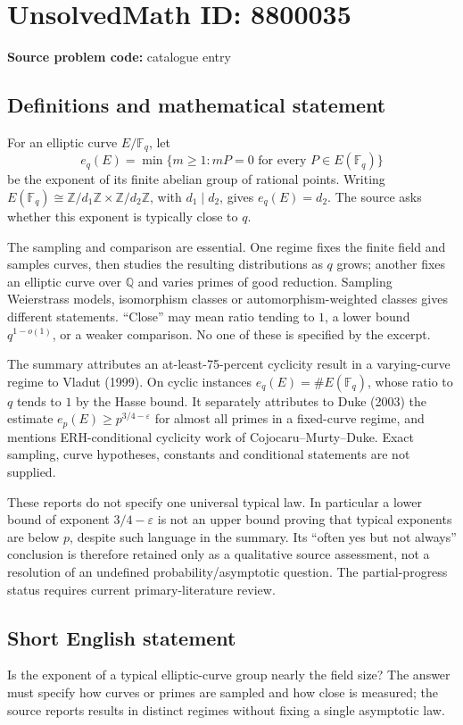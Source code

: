 \documentclass[11pt]{article}
\begin{document}
\section*{UnsolvedMath ID: 8800035}
\textbf{Source problem code:} catalogue entry
\subsection{Definitions and mathematical statement}
For an elliptic curve \(E/\mathbb F_q\), let
\[
 e_q(E)=\min\{m\ge1:mP=0\text{ for every }P\in E(\mathbb F_q)\}
\]
be the exponent of its finite abelian group of rational points. Writing \(E(\mathbb F_q)\cong\mathbb Z/d_1\mathbb Z\times\mathbb Z/d_2\mathbb Z\), with \(d_1\mid d_2\), gives \(e_q(E)=d_2\). The source asks whether this exponent is typically close to \(q\).

The sampling and comparison are essential. One regime fixes the finite field and samples curves, then studies the resulting distributions as \(q\) grows; another fixes an elliptic curve over \(\mathbb Q\) and varies primes of good reduction. Sampling Weierstrass models, isomorphism classes or automorphism-weighted classes gives different statements. ``Close'' may mean ratio tending to \(1\), a lower bound \(q^{1-o(1)}\), or a weaker comparison. No one of these is specified by the excerpt.

The summary attributes an at-least-75-percent cyclicity result in a varying-curve regime to Vladut (1999). On cyclic instances \(e_q(E)=\#E(\mathbb F_q)\), whose ratio to \(q\) tends to \(1\) by the Hasse bound. It separately attributes to Duke (2003) the estimate \(e_p(E)\ge p^{3/4-\varepsilon}\) for almost all primes in a fixed-curve regime, and mentions ERH-conditional cyclicity work of Cojocaru--Murty--Duke. Exact sampling, curve hypotheses, constants and conditional statements are not supplied.

These reports do not specify one universal typical law. In particular a lower bound of exponent \(3/4-\varepsilon\) is not an upper bound proving that typical exponents are below \(p\), despite such language in the summary. Its ``often yes but not always'' conclusion is therefore retained only as a qualitative source assessment, not a resolution of an undefined probability/asymptotic question. The partial-progress status requires current primary-literature review.
\subsection{Short English statement}
Is the exponent of a typical elliptic-curve group nearly the field size? The answer must specify how curves or primes are sampled and how close is measured; the source reports results in distinct regimes without fixing a single asymptotic law.
\end{document}
